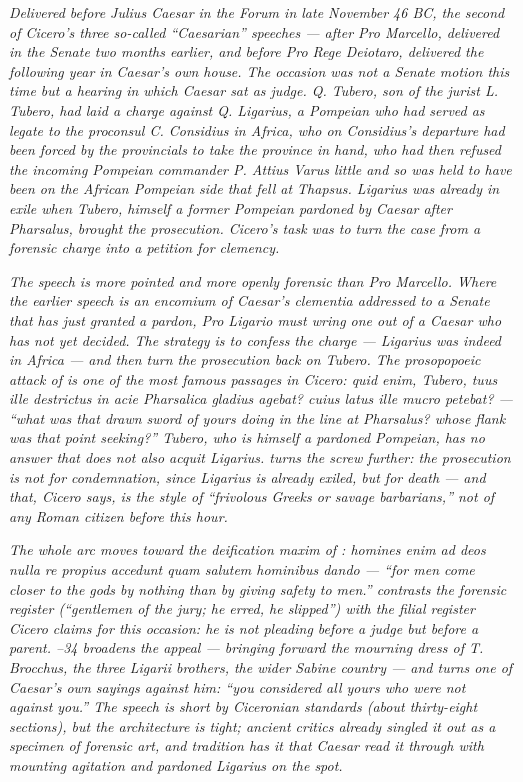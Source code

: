 
\textit{Delivered before Julius Caesar in the Forum in late
November 46 BC, the second of Cicero's three so-called
``Caesarian'' speeches --- after \textit{Pro Marcello},
delivered in the Senate two months earlier, and before
\textit{Pro Rege Deiotaro}, delivered the following year in
Caesar's own house. The occasion was not a Senate motion
this time but a hearing in which Caesar sat as judge. Q.
Tubero, son of the jurist L. Tubero, had laid a charge
against Q. Ligarius, a Pompeian who had served as legate to
the proconsul C. Considius in Africa, who on Considius's
departure had been forced by the provincials to take the
province in hand, who had then refused the incoming Pompeian
commander P. Attius Varus little and so was held to have been
on the African Pompeian side that fell at Thapsus. Ligarius
was already in exile when Tubero, himself a former Pompeian
pardoned by Caesar after Pharsalus, brought the prosecution.
Cicero's task was to turn the case from a forensic charge
into a petition for clemency.}

\textit{The speech is more pointed and more openly forensic
than \textit{Pro Marcello}. Where the earlier speech is an
encomium of Caesar's \textit{clementia} addressed to a
Senate that has just granted a pardon, \textit{Pro Ligario}
must wring one out of a Caesar who has not yet decided. The
strategy is to confess the charge --- Ligarius was indeed in
Africa --- and then turn the prosecution back on Tubero. The
prosopopoeic attack of  is one of the most
famous passages in Cicero: \textit{quid enim, Tubero, tuus
ille destrictus in acie Pharsalica gladius agebat? cuius
latus ille mucro petebat?} --- ``what was that drawn sword
of yours doing in the line at Pharsalus? whose flank was
that point seeking?'' Tubero, who is himself a pardoned
Pompeian, has no answer that does not also acquit Ligarius.
 turns the screw further: the prosecution is
not for condemnation, since Ligarius is already exiled, but
for death --- and that, Cicero says, is the style of
``frivolous Greeks or savage barbarians,'' not of any Roman
citizen before this hour.}

\textit{The whole arc moves toward the deification maxim of
: \textit{homines enim ad deos nulla re
propius accedunt quam salutem hominibus dando} --- ``for men
come closer to the gods by nothing than by giving safety to
men.''  contrasts the forensic register
(``gentlemen of the jury; he erred, he slipped'') with the
filial register Cicero claims for this occasion: he is not
pleading before a judge but before a parent. --34 broadens the appeal --- bringing forward the mourning
dress of T. Brocchus, the three Ligarii brothers, the wider
Sabine country --- and  turns one of
Caesar's own sayings against him: ``you considered all yours
who were not against you.'' The speech is short by Ciceronian
standards (about thirty-eight sections), but the architecture
is tight; ancient critics already singled it out as a
specimen of forensic art, and tradition has it that Caesar
read it through with mounting agitation and pardoned Ligarius
on the spot.}
